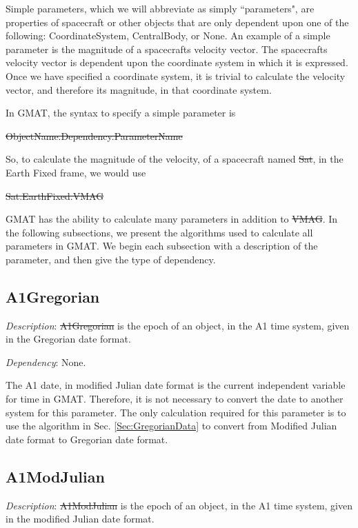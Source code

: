 Simple parameters, which we will abbreviate as simply ``parameters",
are properties of spacecraft or other objects that are only
dependent upon one of the following:  CoordinateSystem, CentralBody,
or None.  An example of a simple parameter is the magnitude of a
spacecrafts velocity vector.  The spacecrafts velocity vector is
dependent upon the coordinate system in which it is expressed.  Once
we have specified a coordinate system, it is trivial to calculate
the velocity vector, and therefore its magnitude, in that coordinate
system.

In GMAT, the syntax to specify a simple parameter is

\st{ObjectName.Dependency.ParameterName}

\noindent So, to calculate the magnitude of the velocity, of a
spacecraft named \st{Sat}, in the Earth Fixed frame, we would use

\st{Sat.EarthFixed.VMAG}

\noindent GMAT has the ability to calculate many parameters in
addition to \st{VMAG}.  In the following subsections, we present the
algorithms used to calculate all parameters in GMAT.  We begin each
subsection with a description of the parameter, and then give the
type of dependency.

\subsection{A1Gregorian} 

\noindent \textit{Description}: \st{A1Gregorian} is the epoch of an
object, in the A1 time system, given in the Gregorian date format.

\noindent \textit{Dependency}:  None.

The A1 date, in modified Julian date format is the current
independent variable for time in GMAT.  Therefore, it is not
necessary to convert the date to another system for this parameter.
The only calculation  required for this parameter is to use the
algorithm in Sec. \ref{Sec:GregorianData} to convert from Modified
Julian date format to Gregorian date format.

\subsection{A1ModJulian} 

\noindent \textit{Description}: \st{A1ModJulian} is the epoch of an
object, in the A1 time system, given in the modified Julian date
format.

